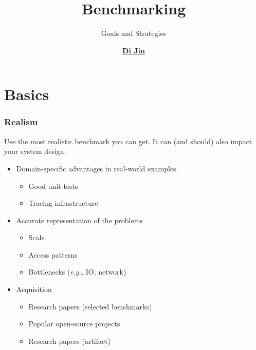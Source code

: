 \documentclass[xcolor={dvipsnames},aspectratio=149]{beamer}
\title[Benchmarking]
{
  Benchmarking
}
\subtitle
{
  Goals and Strategies
}
\author[\href{mailto:di_jin@brown.edu}{Di Jin}]
{
  \href{https://sleepymug.me/}{\textbf{Di Jin}}
}
\date[CSCI2952R]			%
{
}
\def\eg{\emph{e.g.,}\xspace}
\begin{document}
\begin{frame}
\titlepage
\end{frame}

\section{Basics}
\begin{frame}
  \frametitle{Realism}
  Use the most realistic benchmark you can get. It can (and should) also impact your system design.
  \begin{itemize}
  \item Domain-specific advantages in real-world examples.
    \begin{itemize}
    \item Good unit tests
    \item Tracing infrastructure
    \end{itemize}
  \item Accurate representation of the problems
    \begin{itemize}
    \item Scale
    \item Access patterns
    \item Bottlenecks (\eg IO, network)
    \end{itemize}
  \item Acquisition
    \begin{itemize}
    \item Research papers (selected benchmarks)
    \item Popular open-source projects
    \item Research papers (artifact)
    \end{itemize}
  \end{itemize}
\end{frame}
\end{document}
